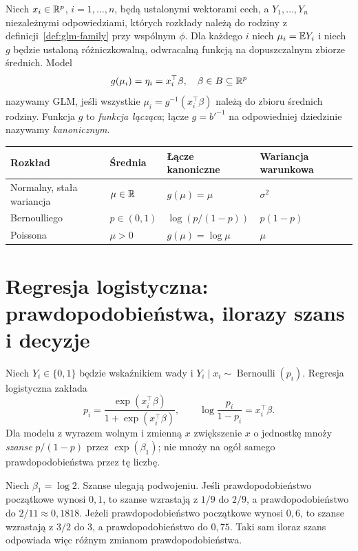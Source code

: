 \begin{definicja}
\label{def:glm}
Niech $x_i\in\mathbb R^p$, $i=1,\ldots,n$, będą ustalonymi
wektorami cech, a $Y_1,\ldots,Y_n$ niezależnymi
odpowiedziami, których rozkłady należą do rodziny
z definicji~\ref{def:glm-family} przy wspólnym $\phi$.
Dla każdego $i$ niech $\mu_i=\mathbb E Y_i$ i niech
$g$ będzie ustaloną różniczkowalną, odwracalną funkcją
na dopuszczalnym zbiorze średnich. Model
\[
 g(\mu_i)=\eta_i=x_i^\top\beta,
 \quad \beta\in B\subseteq\mathbb R^p
\]
nazywamy GLM, jeśli wszystkie $\mu_i=g^{-1}(x_i^\top\beta)$
należą do zbioru średnich rodziny. Funkcja $g$
to \emph{funkcja łącząca}; łącze
$g=b'^{-1}$ na odpowiedniej dziedzinie
nazywamy \emph{kanonicznym}.
\end{definicja}

\begin{center}\small
\begin{tabular}{>{\raggedright\arraybackslash}p{}>{\raggedright\arraybackslash}p{}>{\raggedright\arraybackslash}p{}>{\raggedright\arraybackslash}p{}}
\toprule
\textbf{Rozkład} & \textbf{Średnia} & \textbf{Łącze kanoniczne} & \textbf{Wariancja warunkowa}\\
\midrule
Normalny, stała wariancja & $\mu\in\mathbb R$ & $g(\mu)=\mu$ & $\sigma^2$\\
Bernoulliego & $p\in(0,1)$ & $\log(p/(1-p))$ & $p(1-p)$\\
Poissona & $\mu>0$ & $g(\mu)=\log\mu$ & $\mu$\\
\bottomrule
\end{tabular}
\end{center}

\section{Regresja logistyczna: prawdopodobieństwa, ilorazy szans i decyzje}
Niech $Y_i\in\{0,1\}$ będzie wskaźnikiem wady i
$Y_i\mid x_i\sim\operatorname{Bernoulli}(p_i)$.
Regresja logistyczna zakłada
\[
 p_i=\frac{\exp(x_i^\top\beta)}
          {1+\exp(x_i^\top\beta)},\qquad
 \log\frac{p_i}{1-p_i}=x_i^\top\beta.
\]
Dla modelu z wyrazem wolnym i zmienną $x$ zwiększenie
$x$ o jednostkę mnoży \emph{szanse} $p/(1-p)$ przez
$\exp(\beta_1)$; nie mnoży na ogół samego
prawdopodobieństwa przez tę liczbę.

\begin{przyklad}
Niech $\beta_1=\log2$. Szanse ulegają podwojeniu.
Jeśli prawdopodobieństwo początkowe wynosi $0{,}1$,
to szanse wzrastają z $1/9$ do $2/9$,
a prawdopodobieństwo do $2/11\approx0{,}1818$.
Jeżeli prawdopodobieństwo początkowe wynosi $0{,}6$,
to szanse wzrastają z $3/2$ do $3$,
a prawdopodobieństwo do $0{,}75$.
Taki sam iloraz szans odpowiada więc różnym zmianom
prawdopodobieństwa.
\end{przyklad}

